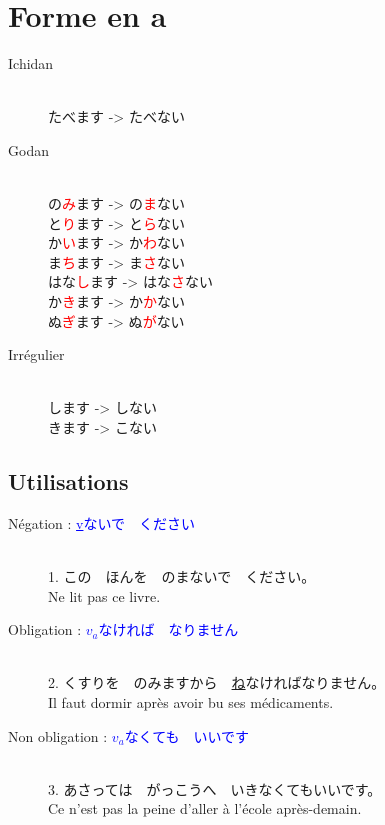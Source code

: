 \documentclass[11pt]{report}
\newenvironment{Japanese}{%
\CJKfamily{min}%
\CJKtilde  
\CJKnospace}{}
\begin{document}
\section{Forme en a}

\begin{CJK}{UTF8}{}  
\begin{Japanese}
	\begin{description}
		\item[Ichidan] \hfill \\
			たべます -> たべない
		\item[Godan] \hfill \\
			の\textcolor{red}{み}ます -> の\textcolor{red}{ま}ない \\
			と\textcolor{red}{り}ます -> と\textcolor{red}{ら}ない \\
			か\textcolor{red}{い}ます -> か\textcolor{red}{わ}ない \\
			ま\textcolor{red}{ち}ます -> ま\textcolor{red}{さ}ない \\
			はな\textcolor{red}{し}ます -> はな\textcolor{red}{さ}ない \\
			か\textcolor{red}{き}ます -> か\textcolor{red}{か}ない \\
			ぬ\textcolor{red}{ぎ}ます -> ぬ\textcolor{red}{が}ない
		\item[Irrégulier] \hfill \\
			します -> しない \\
			きます -> こない
	\end{description}
\end{Japanese}  
\end{CJK}

\subsection{Utilisations}

\begin{CJK}{UTF8}{}  
\begin{Japanese}
	\begin{description}
		\item[Négation : \textcolor{blue}{\underline{v}ないで　ください}] \hfill \\
		1. この　ほんを　のまないで　ください。 \\
		Ne lit pas ce livre.
		\item[Obligation : \textcolor{blue}{\underline{$v_{a}$}なければ　なりません}] \hfill \\
		2. くすりを　のみますから　\underline{ね}なければなりません。 \\
		Il faut dormir après avoir bu ses médicaments.
		\item[Non obligation : \textcolor{blue}{\underline{$v_{a}$}なくても　いいです}] \hfill \\
		3. あさっては　がっこうへ　いきなくてもいいです。 \\
		Ce n'est pas la peine d'aller \`a l'école après-demain.
	\end{description}
\end{Japanese}
\end{CJK}
\end{document}
